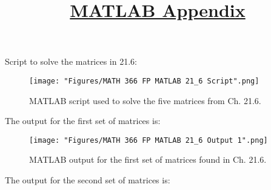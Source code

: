 \newpage
\title{\underline{\LARGE{\textbf{MATLAB Appendix}}} \\ {\Large\itshape }} %
\maketitle 
\vspace{5pt} 
\newline
\pagestyle{fancy}
Script to solve the matrices in 21.6:
\begin{figure}[htbp]
\begin{center}
\texttt{[image: "Figures/MATH 366 FP MATLAB 21\_6 Script".png]}
\caption*{MATLAB script used to solve the five matrices from Ch. 21.6.}
\end{center}
\end{figure}
\newline
The output for the first set of matrices is:
\begin{figure}[htbp]
\begin{center}
\texttt{[image: "Figures/MATH 366 FP MATLAB 21\_6 Output 1".png]}
\caption*{MATLAB output for the first set of matrices found in Ch. 21.6.}
\end{center}
\end{figure}
\newline
The output for the second set of matrices is:
